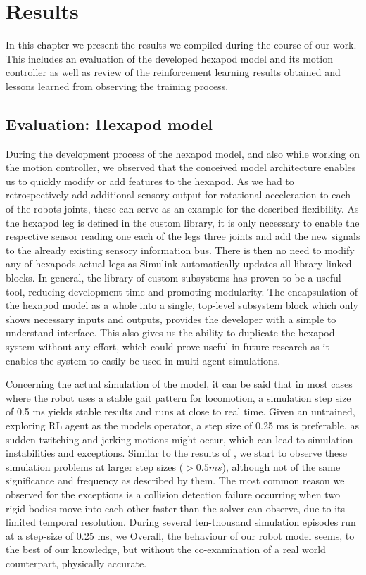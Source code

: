 \chapter{Results}
\label{ch:results}

In this chapter we present the results we compiled during the course of our work.
This includes an evaluation of the developed hexapod model and its motion controller as well as review of the reinforcement learning results obtained and lessons learned from observing the training process.

\section{Evaluation: Hexapod model}
During the development process of the hexapod model, and also while working on the motion controller, we observed that the conceived model architecture enables us to quickly modify or add features to the hexapod.
As we had to retrospectively add additional sensory output for rotational acceleration to each of the robots joints, these can serve as an example for the described flexibility. 
As the hexapod leg is defined in the custom library, it is only necessary to enable the respective sensor reading one each of the legs three joints and add the new signals to the already existing sensory information bus. 
There is then no need to modify any of hexapods actual legs as Simulink automatically updates all library-linked blocks.
In general, the library of custom subsystems has proven to be a useful tool, reducing development time and promoting modularity.
The encapsulation of the hexapod model as a whole into a single, top-level subsystem block which only shows necessary inputs and outputs, provides the developer with a simple to understand interface.
This also gives us the ability to duplicate the hexapod system without any effort, which could prove useful in future research as it enables the system to easily be used in multi-agent simulations.

Concerning the actual simulation of the model, it can be said that in most cases where the robot uses a stable gait pattern for locomotion, a simulation step size of 0.5 ms yields stable results and runs at close to real time.
Given an untrained, exploring RL agent as the models operator, a step size of 0.25 ms is preferable, as sudden twitching and jerking motions might occur, which can lead to simulation instabilities and exceptions.
Similar to the results of \cite{thilderkvist2015motion}, we start to observe these simulation problems at larger step sizes ($> 0.5 ms$), although not of the same significance and frequency as described by them. 
The most common reason we observed for the exceptions is a collision detection failure occurring when two rigid bodies move into each other faster than the solver can observe, due to its limited temporal resolution.
During several ten-thousand simulation episodes run at a step-size of 0.25 ms, we 
Overall, the behaviour of our robot model seems, to the best of our knowledge, but without the co-examination of a real world counterpart, physically accurate.

